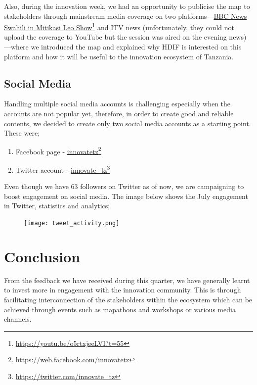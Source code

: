 \documentclass[a4paper,12pt,twoside]{article}
\begin{document}
Also, during the innovation week, we had an opportunity to publicise the map to stakeholders through mainstream media coverage on two platforms---\href{https://youtu.be/o5rtxjeeLVI?t=55}{BBC News Swahili in Mitikasi Leo Show}\footnote{\url{https://youtu.be/o5rtxjeeLVI?t=55}} and ITV news (unfortunately, they could not upload the coverage to YouTube but the session was aired on the evening news)---where we introduced the map and explained why HDIF is interested on this platform and how it will be useful to the innovation ecosystem of Tanzania.

\subsection{Social Media}
Handling multiple social media accounts is challenging especially when the accounts are not popular yet, therefore, in order to create good and reliable contents, we decided to create only two social media accounts as a starting point. These were;

\begin{enumerate}
	\item Facebook page - \href{https://web.facebook.com/innovatetz}{innovatetz}\footnote{\url{https://web.facebook.com/innovatetz}}
	\item Twitter account - \href{https://twitter.com/innovate_tz}{innovate\_tz}\footnote{\url{https://twitter.com/innovate_tz}}
\end{enumerate}

Even though we have 63 followers on Twitter as of now, we are campaigning to boost engagement on social media. The image below shows the July engagement in Twitter, statistics and analytics; 

\begin{figure}[h]
    \centering
    \texttt{[image: tweet\_activity.png]}
\end{figure}

\newpage
\section{Conclusion}
From the feedback we have received during this quarter, we have generally learnt to invest more in engagement with the innovation community. This is through facilitating interconnection of the stakeholders within the ecosystem which can be achieved through events such as mapathons and workshops or various media channels.

\newpage
\end{document}
